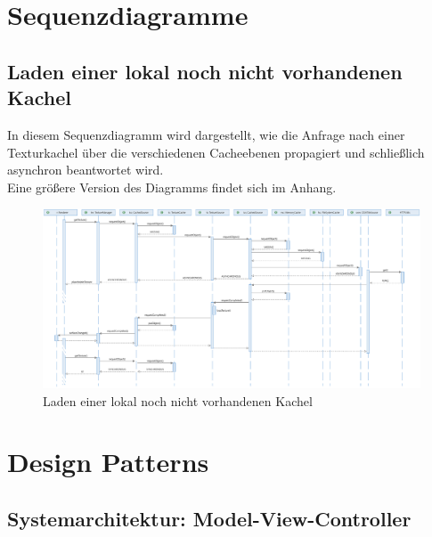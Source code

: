 \documentclass[10pt]{scrreprt}
\begin{document}
\chapter{Sequenzdiagramme}

\section{Laden einer lokal noch nicht vorhandenen Kachel}
In diesem Sequenzdiagramm wird dargestellt, wie die Anfrage nach einer Texturkachel über die verschiedenen Cacheebenen propagiert und schließlich asynchron beantwortet wird.\\[3mm]
Eine größere Version des Diagramms findet sich im Anhang.

\vspace{5mm}
\begin{figure}[h]
\begin{centering}
\includegraphics[scale=0.28]{sequenz-osmtile.eps}
\caption{Laden einer lokal noch nicht vorhandenen Kachel}
\end{centering}
\end{figure}




\chapter{Design Patterns}

\section{Systemarchitektur: Model-View-Controller}
\end{document}
